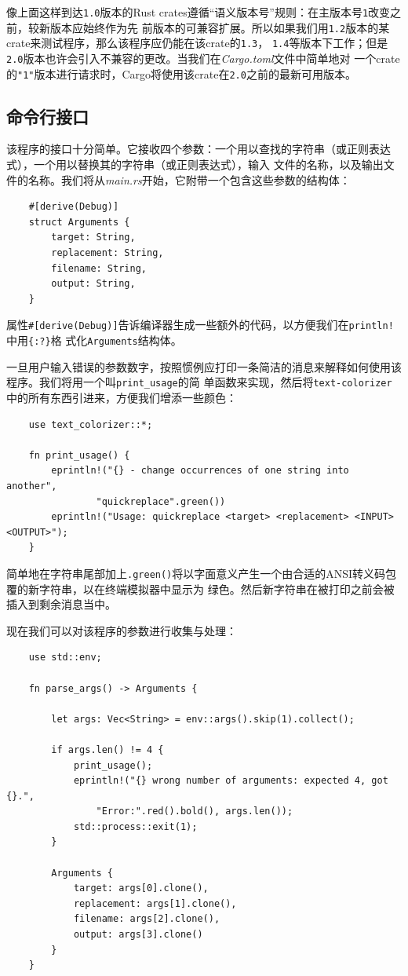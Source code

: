 \smallskip
像上面这样到达\texttt{1.0}版本的Rust crates遵循“语义版本号”规则：在主版本号\texttt{1}改变之前，较新版本应始终作为先
前版本的可兼容扩展。所以如果我们用\texttt{1.2}版本的某crate来测试程序，那么该程序应仍能在该crate的\texttt{1.3}，
\texttt{1.4}等版本下工作；但是\texttt{2.0}版本也许会引入不兼容的更改。当我们在\textit{Cargo.toml}文件中简单地对
一个crate的\texttt{"1"}版本进行请求时，Cargo将使用该crate在\texttt{2.0}之前的最新可用版本。

\medskip
\subsection{命令行接口}
该程序的接口十分简单。它接收四个参数：一个用以查找的字符串（或正则表达式），一个用以替换其的字符串（或正则表达式），输入
文件的名称，以及输出文件的名称。我们将从\textit{main.rs}开始，它附带一个包含这些参数的结构体：
\begin{verbatim}
    #[derive(Debug)]
    struct Arguments {
        target: String,
        replacement: String,
        filename: String,
        output: String,
    }
\end{verbatim}

\smallskip
属性\texttt{\#[derive(Debug)]}告诉编译器生成一些额外的代码，以方便我们在\texttt{println!}中用\texttt{\{:?\}}格
式化\texttt{Arguments}结构体。

\medskip
一旦用户输入错误的参数数字，按照惯例应打印一条简洁的消息来解释如何使用该程序。我们将用一个叫\texttt{print\_usage}的简
单函数来实现，然后将\texttt{text-colorizer}中的所有东西引进来，方便我们增添一些颜色：
\begin{verbatim}
    use text_colorizer::*;

    fn print_usage() {
        eprintln!("{} - change occurrences of one string into another",
                "quickreplace".green())
        eprintln!("Usage: quickreplace <target> <replacement> <INPUT> <OUTPUT>");
    }
\end{verbatim}

\smallskip
简单地在字符串尾部加上\texttt{.green()}将以字面意义产生一个由合适的ANSI转义码包覆的新字符串，以在终端模拟器中显示为
绿色。然后新字符串在被打印之前会被插入到剩余消息当中。

\medskip
现在我们可以对该程序的参数进行收集与处理：
\begin{verbatim}
    use std::env;

    fn parse_args() -> Arguments {
        
        let args: Vec<String> = env::args().skip(1).collect();

        if args.len() != 4 {
            print_usage();
            eprintln!("{} wrong number of arguments: expected 4, got {}.",
                "Error:".red().bold(), args.len());
            std::process::exit(1);
        }

        Arguments { 
            target: args[0].clone(), 
            replacement: args[1].clone(),
            filename: args[2].clone(), 
            output: args[3].clone() 
        }
    }
\end{verbatim}

